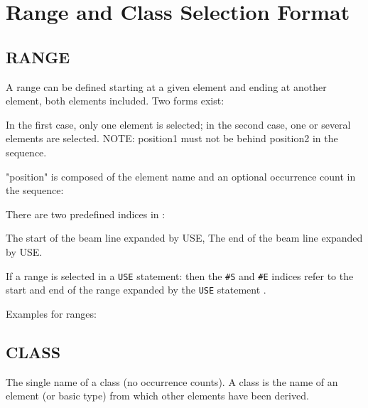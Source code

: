 
\chapter{Range and Class Selection Format}

\section{RANGE}
\label{sec:range}

A range can be defined starting at  a given element and ending at
another element, both elements included. Two forms exist:  


In the first case, only one element is selected; in the second case, one
or several elements are selected. NOTE: position1 must not be behind
position2 in the sequence.  

"position" is composed of the element name and an optional occurrence 
count in the sequence: \label{range_position}

There are two predefined indices in \madx: 
\begin{madlist}
    The start of the beam line expanded by USE, 
    The end of the beam line expanded by USE. 
\end{madlist} 

If a range is selected in a {\tt USE} statement: 
then the  {\tt \#S} and {\tt \#E} indices refer to the start and end of the 
range expanded by the {\tt USE} statement . 

 Examples for ranges: 

\section{CLASS}
\label{sec:range_class} 
The single name of a class (no occurrence counts). A class is the name
of an element (or basic type) from which other elements have been
derived. 

